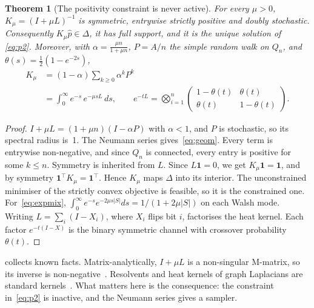 \documentclass[11pt]{article}
\newtheorem{theorem}{Theorem}
\theoremstyle{definition}
\theoremstyle{remark}
\newcommand{\simplex}{\Delta}
\newcommand{\hp}{\hat p}
\begin{document}
\begin{theorem}[The positivity constraint is never active]\label{thm:p2}
For every $\mu>0$, $K_\mu=(I+\mu L)^{-1}$ is symmetric, entrywise strictly positive and doubly stochastic. Consequently $K_\mu\hp\in\simplex$, it has full support, and it is the unique solution of \eqref{eq:p2}. Moreover, with $\alpha=\frac{\mu n}{1+\mu n}$, $P=A/n$ the simple random walk on $Q_n$, and $\theta(s)=\tfrac12(1-e^{-2s})$,
\begin{align}
K_\mu &= (1-\alpha)\sum_{k\ge0}\alpha^k P^k \label{eq:geom}\\
      &= \int_0^\infty e^{-s}\,e^{-\mu sL}\,ds,\qquad
      e^{-tL}=\bigotimes_{i=1}^n\begin{pmatrix}1-\theta(t)&\theta(t)\\ \theta(t)&1-\theta(t)\end{pmatrix}. \label{eq:expmix}
\end{align}
\end{theorem}
\begin{proof}
$I+\mu L=(1+\mu n)(I-\alpha P)$ with $\alpha<1$, and $P$ is stochastic, so its spectral radius is~1. The Neumann series gives~\eqref{eq:geom}. Every term is entrywise non-negative, and since $Q_n$ is connected, every entry is positive for some $k\le n$. Symmetry is inherited from $L$. Since $L\mathbf1=0$, we get $K_\mu\mathbf 1=\mathbf 1$, and by symmetry $\mathbf 1^\top K_\mu=\mathbf1^\top$. Hence $K_\mu$ maps $\simplex$ into its interior. The unconstrained minimiser of the strictly convex objective is feasible, so it is the constrained one. For~\eqref{eq:expmix}, $\int_0^\infty e^{-s}e^{-2\mu s|S|}ds=1/(1+2\mu|S|)$ on each Walsh mode. Writing $L=\sum_i(I-X_i)$, where $X_i$ flips bit $i$, factorises the heat kernel. Each factor $e^{-t(I-X)}$ is the binary symmetric channel with crossover probability $\theta(t)$.
\end{proof}

 collects known facts. Matrix-analytically, $I+\mu L$ is a non-singular M-matrix, so its inverse is non-negative~\cite{berman1994nonnegative}. Resolvents and heat kernels of graph Laplacians are standard kernels~\cite{kondor2002diffusion,smola2003kernels}. What matters here is the consequence: the constraint in~\eqref{eq:p2} is inactive, and the Neumann series gives a sampler.
\end{document}
